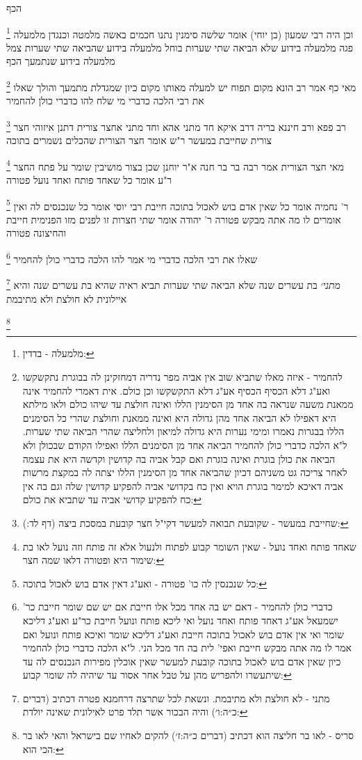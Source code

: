 \documentclass[12pt, openany]{book}
\newcommand{\footnotecomment}[1]{
	\renewcommand\thefootnote{}
	\footnote{#1}}
\newcommand{\commenta}[1]{\footnotecomment{#1}}
\begin{document}
{הכף 
\commenta{מלמעלה - בדדין:}
וכן היה רבי שמעון (בן יוחי) אומר שלשה סימנין נתנו חכמים באשה מלמטה וכנגדן מלמעלה פגה מלמעלה בידוע שלא הביאה שתי שערות בוחל מלמעלה בידוע שהביאה שתי שערות צמל מלמעלה בידוע שנתמעך הכף 
\commenta{להחמיר - איזה מאלו שתביא שוב אין אביה מפר נדריה דמחזקינן לה בבוגרת נתקשקשו ואע"ג דלא הכסיף הכסיף אע"ג דלא התקשקשו וכן כולם. אית דאמרי להחמיר אינה ממאנת משעה שנראה בה אחד מן הסימנין הללו ואינה חולצת עד שיהו כולם ולאו מילתא היא דאפילו לא הביאה אחד מהן גדולה היא ואינה ממאנת וחולצת שהרי כל הסימנים הללו בבגרות נאמרו ומימי נערות היא גדולה למיאון ולחליצה שהרי הביאה שתי שערות. ל"א הלכה כדברי כולן להחמיר הביאה אחד מן הסימנים הללו ואפילו הקודם שבכולן ולא הביאה את כולן בוגרת ואינה בוגרת ואם קבל אביה בה קדושין וקדשה היא את עצמה לאחר צריכה גט משניהם דכיון שהביאה אחד מן הסימנין הללו יצתה לה במקצת מרשות אביה דאיכא למימר בוגרת הויא ואין כח בקדושי אביה להפקיע קדושין שלה וגם בה אין כח להפקיע קדושי אביה עד שתביא את כולם:}
מאי כף אמר רב הונא מקום תפוח יש למעלה מאותו מקום כיון שמגדלת מתמעך והולך שאלו את רבי הלכה כדברי מי שלח להו כדברי כולן להחמיר 
\commenta{שחייבת במעשר - שקובעת תבואה למעשר דקי"ל חצר קובעת במסכת ביצה (דף לד:):}
רב פפא ורב חיננא בריה דרב איקא חד מתני אהא וחד מתני אחצר צורית דתנן איזוהי חצר צורית שחייבת במעשר ר"ש אומר חצר הצורית שהכלים נשמרים בתוכה 
\commenta{שאחד פותח ואחד נועל - שאין השומר קבוע לפתוח ולנעול אלא זה פותח וזה נועל לאו בת שימור היא ופטורה דלאו שמה חצר:}
מאי חצר הצורית אמר רבה בר בר חנה א"ר יוחנן שכן בצור מושיבין שומר על פתח החצר ר"ע אומר כל שאחד פותח ואחד נועל פטורה 
\commenta{כל שנכנסין לה כו' פטורה - ואע"ג דאין אדם בוש לאכול בתוכה:}
ר' נחמיה אומר כל שאין אדם בוש לאכול בתוכה חייבת רבי יוסי אומר כל שנכנסים לה ואין אומרים לו מה אתה מבקש פטורה 
ר' יהודה אומר שתי חצרות זו לפנים מזו הפנימית חייבת והחיצונה פטורה 
\commenta{כדברי כולן להחמיר - דאם יש בה אחד מכל אלו חייבת אם יש שם שומר חייבת כר' ישמעאל אע"ג דאחד פותח ואחד נועל ואי ליכא פותח ונועל חייבת כר"ע ואע"ג דליכא שומר ואי אין אדם בוש לאכול בתוכה חייבת ואע"ג דליכא שומר ואיכא פותח ונועל ואם אמר לו מה אתה מבקש חייבת ואפי' לית בה חד מכל הני. ל"א הלכה כדברי כולן להחמיר כיון שאין אדם בוש לאכול בתוכה קובעת למעשר שאין אוכלין מפירות הנכנסים לה עד שיתעשרו ולהפריש מהן על טבל אחר אסור עד שיהיה לה שומר קבוע:}
שאלו את רבי הלכה כדברי מי אמר להו הלכה כדברי כולן להחמיר
\commenta{מתני - לא חולצת ולא מתיבמת. ונשאת לכל שתרצה דרחמנא פטרה דכתיב (דברים כ״ה:ו׳) והיה הבכור אשר תלד פרט לאילונית שאינה יולדת:}
{\large\emph{מתני׳}} בת עשרים שנה שלא הביאה שתי שערות תביא ראיה שהיא בת עשרים שנה והיא איילונית לא חולצת ולא מתיבמת
\commenta{סריס - לאו בר חליצה הוא דכתיב (דברים כ״ה:ז׳) להקים לאחיו שם בישראל והאי לאו בר הכי הוא:}
}
\end{document}
